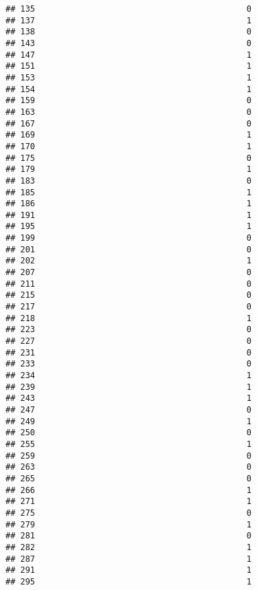 \documentclass[
]{article}
\begin{document}
\begin{verbatim}
## 135                                           0
## 137                                           1
## 138                                           0
## 143                                           0
## 147                                           1
## 151                                           1
## 153                                           1
## 154                                           1
## 159                                           0
## 163                                           0
## 167                                           0
## 169                                           1
## 170                                           1
## 175                                           0
## 179                                           1
## 183                                           0
## 185                                           1
## 186                                           1
## 191                                           1
## 195                                           1
## 199                                           0
## 201                                           0
## 202                                           1
## 207                                           0
## 211                                           0
## 215                                           0
## 217                                           0
## 218                                           1
## 223                                           0
## 227                                           0
## 231                                           0
## 233                                           0
## 234                                           1
## 239                                           1
## 243                                           1
## 247                                           0
## 249                                           1
## 250                                           0
## 255                                           1
## 259                                           0
## 263                                           0
## 265                                           0
## 266                                           1
## 271                                           1
## 275                                           0
## 279                                           1
## 281                                           0
## 282                                           1
## 287                                           1
## 291                                           1
## 295                                           1

\end{verbatim}
\end{document}
